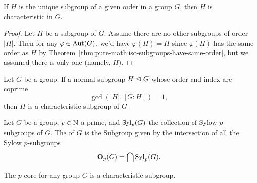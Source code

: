 \begin{theorem}
  If $H$ is the unique subgroup of a given order in a group $G$,
  then $H$ is characteristic in $G$.
\end{theorem}

\begin{proof}
Let $H$ be a subgroup of $G$. Assume there are no other subgroups of
order $|H|$. Then for any $\varphi\in\operatorname{Aut}(G)$, we'd have $\varphi(H)=H$
since $\varphi(H)$ has the same order as $H$ by
Theorem~\ref{thm:pure-math:iso-subgroups-have-same-order}, but we
assumed there is only one (namely, $H$).
\end{proof}

\begin{theorem}
Let $G$ be a group. If a normal subgroup $H\trianglelefteq G$ whose
order and index are coprime
\begin{equation*}
\gcd(|H|, [G:H])=1,
\end{equation*}
then $H$ is a characteristic subgroup of $G$.
\end{theorem}

\begin{definition}
Let $G$ be a group, $p\in\mathbb{N}$ a prime, and $\mathop{\rm Syl}\nolimits_{p}(G)$ the
collection of Sylow $p$-subgroups of $G$. The  of $G$
is the Subgroup given by the intersection of all the Sylow $p$-subgroups
\begin{equation*}
\mathbf{O}_{p}(G) = \bigcap \mathop{\rm Syl}\nolimits_{p}(G).
\end{equation*}
\end{definition}

\begin{theorem}
The $p$-core for any group $G$ is a characteristic subgroup.
\end{theorem}
